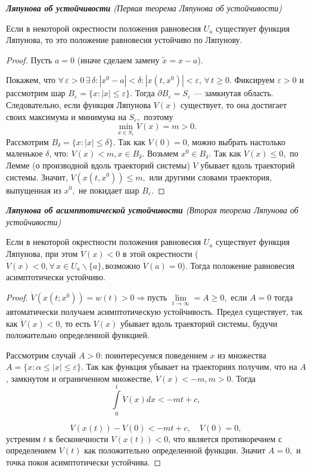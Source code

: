 \begin{theorem}  \textit{\textbf{Ляпунова об устойчивости} (Первая теорема Ляпунова об устойчивости)}


Если в некоторой окрестности положения равновесия $U_a$ существует функция Ляпунова, то это положение равновесия устойчиво по Ляпунову.
\end{theorem}
\begin{proof}
Пусть $a = 0$ (иначе сделаем замену $\tilde x = x-a$).

Покажем, что $\forall \, \varepsilon >0 \, \exists \, \delta:|x^0 - a| < \delta: |x(t, x^0)| < \varepsilon , \, \forall \, t \geqslant 0.$
Фиксируем $\varepsilon >0$ и рассмотрим шар $B_{\varepsilon} = \big \{ x: |x| \leqslant  \varepsilon \big \}.$ Тогда $\partial B_{\varepsilon} = S_{\varepsilon}$ --- замкнутая область. Следовательно, если функция Ляпунова $V(x)$ существует, то она достигает своих максимума и минимума на $S_{\varepsilon},$ поэтому 
$$
\min\limits_{x \in S_{\varepsilon}} V(x) = m >0.
$$
Рассмотрим $B_{\delta} = \big \{ x: |x| \leqslant  \delta \big \}.$ Так как $V(0) = 0$, можно выбрать настолько маленькое $\delta $, что: $V(x) < m, x \in B_{\delta}.$
Возьмем $x^0 \in B_{\delta}.$ Так как $\dot V(x) \leqslant 0,$ по Лемме (о производной вдоль траекторий системы) $V$ убывает вдоль траекторий системы. Значит, $V(x(t, x^0)) \leqslant m,$ или другими словами траектория, выпущенная из $x^0,$ не покидает шар $B_{\varepsilon}.$ \end{proof}

\begin{theorem} \textit{\textbf{Ляпунова об асимптотической устойчивости} (Вторая теорема Ляпунова об устойчивости)}

Если в некоторой окрестности положения равновесия $U_a$ существует функция Ляпунова, при этом $\dot V(x) < 0$ в этой окрестности ($\dot V(x) < 0,  \forall \, x \in U_a \backslash \{a\}, \text{возможно } \dot V(a) = 0$). Тогда положение равновесия асимптотически устойчиво.
\end{theorem}
\begin{proof}
$\dot V(x(t; x^0)) = w(t) > 0  \Rightarrow \text{пусть } \lim\limits_{t \rightarrow \infty} = A \geqslant 0,$ если $A = 0$ тогда автоматически получаем асимптотическую устойчивость. Предел существует, так как $\dot V(x) < 0$, то есть $V(x)$ убывает вдоль траекторий системы, будучи положительно определенной функцией.

Рассмотрим случай $A>0$: поинтересуемся поведением $x$ из множества $A = \{ x:  \alpha \leqslant |x| \leqslant \varepsilon \}.$ Так как функция убывает на траекториях получим, что на $A$, замкнутом и ограниченном множестве, $\dot V(x) < -m, m >0.$ Тогда
$$
\int\limits_0^t \dot V(x) dx < - mt +c,
$$

$$
V(x(t)) - V(0) < -mt +c,  \quad V(0) = 0,
$$
устремим $t$ к бесконечности $V(x(t)) < 0$, что является противоречием с определением $V(t)$ как положительно определенной функции. Значит $A = 0,$ и точка покоя асимптотически устойчива.  \end{proof}


